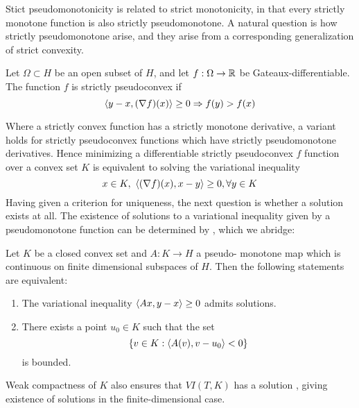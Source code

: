 Stict pseudomonotonicity is related to strict monotonicity, in that every strictly monotone function is also strictly pseudomonotone. A natural question is how strictly pseudomonotone arise, and they arise from a corresponding generalization of strict convexity.
\begin{definition}
  Let $\Omega \subset H$ be an open subset of $H$, and let $f:\Omega \to \mathbb{R}$ be Gateaux-differentiable. The function $f$ is strictly pseudoconvex if
  \begin{equation}
    \left \langle y-x,(\nabla f)(x) \right \rangle \geq 0 \Rightarrow f(y) > f(x)
  \end{equation}
\end{definition}
Where a strictly convex function has a strictly monotone derivative, a variant holds for strictly pseudoconvex functions which have strictly pseudomonotone derivatives.
Hence minimizing a differentiable strictly pseudoconvex $f$ function over a convex set $K$ is equivalent to solving the variational inequality \citep[P. 521]{hadjisavvas2006handbook}
\begin{equation}
  \label{eq:min_func}
  x \in K, ~ \left \langle (\nabla f)(x),x-y \right \rangle \geq 0, \forall y\in K
\end{equation}
Having given a criterion for uniqueness, the next question is whether a solution exists at all. The existence of solutions to a variational inequality given by a pseudomonotone function can be determined by \citep[Theorem 3.4]{maugeri2009existence}, which we abridge:
\begin{theorem}
  \label{thm:existence}
  Let $K$ be a closed convex set and $A : K \to H$  a pseudo-
  monotone map which is continuous on finite dimensional subspaces of $H$. Then the following statements are equivalent:
\end{theorem}
\begin{enumerate}
  \item The variational inequality $\left \langle Ax,y-x \right \rangle \geq 0$ admits solutions.
  \item There exists a point $u_0 \in K$ such that the set
  \begin{equation}
    \{v \in K : \left \langle A(v),v-u_0 \right \rangle < 0\}
  \end{equation}
  is bounded.
\end{enumerate}
\begin{remark}
  \label{rem:weak_compact}
  Weak compactness of $K$ also ensures that $VI(T,K)$ has a solution \citep[Theorem 12.1, P. 510]{hadjisavvas2006handbook}, giving existence of solutions in the finite-dimensional case.
\end{remark}
